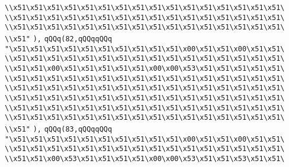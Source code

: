 \verb|\\x51\x51\x51\x51\x51\x51\x51\x51\x51\x51\x51\x51\x51\x51\x51\x51\|\newline
\verb|\\x51\x51\x51\x51\x51\x51\x51\x51\x51\x51\x51\x51\x51\x51\x51\x51\|\newline
\verb|\\x51\x51\x51\x51\x51\x51\x51\x51\x51\x51\x51\x51\x51\x51\x51\x51\|\newline
\verb|\\x51"|\newline
\verb|),|\newline
\verb|qQQq(82,qQQqqQQq|\newline
\verb|"\x51\x51\x51\x51\x51\x51\x51\x51\x51\x51\x00\x51\x51\x00\x51\x51\|\newline
\verb|\\x51\x51\x51\x51\x51\x51\x51\x51\x51\x51\x51\x51\x51\x51\x51\x51\|\newline
\verb|\\x51\x51\x00\x51\x51\x51\x51\x51\x00\x00\x53\x51\x51\x51\x51\x51\|\newline
\verb|\\x51\x51\x51\x51\x51\x51\x51\x51\x51\x51\x51\x51\x51\x51\x51\x51\|\newline
\verb|\\x51\x51\x51\x51\x51\x51\x51\x51\x51\x51\x51\x51\x51\x51\x51\x51\|\newline
\verb|\\x51\x51\x51\x51\x51\x51\x51\x51\x51\x51\x51\x51\x51\x51\x51\x51\|\newline
\verb|\\x51\x51\x51\x51\x51\x51\x51\x51\x51\x51\x51\x51\x51\x51\x51\x51\|\newline
\verb|\\x51\x51\x51\x51\x51\x51\x51\x51\x51\x51\x51\x51\x51\x51\x51\x51\|\newline
\verb|\\x51"|\newline
\verb|),|\newline
\verb|qQQq(83,qQQqqQQq|\newline
\verb|"\x51\x51\x51\x51\x51\x51\x51\x51\x51\x51\x00\x51\x51\x00\x51\x51\|\newline
\verb|\\x51\x51\x51\x51\x51\x51\x51\x51\x51\x51\x51\x51\x51\x51\x51\x51\|\newline
\verb|\\x51\x51\x00\x53\x51\x51\x51\x51\x00\x00\x53\x51\x51\x53\x51\x51\|\newline
